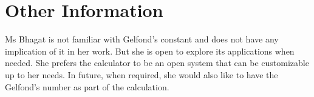 \documentclass[letterpaper]{twentysecondcv}
\begin{document}
\section{Other Information}

Ms Bhagat is not familiar with Gelfond's constant and does not have any implication of it in her work. But she is open to explore its applications when needed. She prefers the calculator to be an open system that can be customizable up to her needs. In future, when required, she would also like to have the Gelfond's number as part of the calculation. \newline
\end{document}
